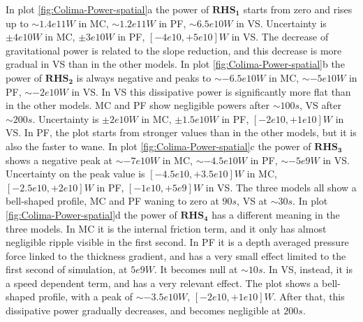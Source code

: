 \documentclass{article}
\begin{document}
In plot \ref{fig:Colima-Power-spatial}a the power of $\boldsymbol{RHS_1}$ starts from zero and rises up to $\sim 1.4e11 W$ in MC, $\sim 1.2e11 W$ in PF, $\sim 6.5e10 W$ in VS. Uncertainty is $\pm 4e10 W$ in MC, $\pm 3e10 W$ in PF, $[-4e10,+5e10] W$ in VS. The decrease of gravitational power is related to the slope reduction, and this decrease is more gradual in VS than in the other models. In plot \ref{fig:Colima-Power-spatial}b the power of  $\boldsymbol{RHS_2}$ is always negative and peaks to $\sim -6.5e10 W$ in MC, $\sim -5e10 W$ in PF, $\sim -2e10 W$ in VS. In VS this dissipative power is significantly more flat than in the other models. MC and PF show negligible powers after $\sim 100 s$, VS after $\sim 200 s$. Uncertainty is $\pm 2e10 W$ in MC, $\pm 1.5e10 W$ in PF, $[-2e10,+1e10] W$ in VS. In PF, the plot starts from stronger values than in the other models, but it is also the faster to wane. In plot \ref{fig:Colima-Power-spatial}c the power of $\boldsymbol{RHS_3}$ shows a negative peak at $\sim -7e10 W$ in MC, $\sim -4.5e10 W$ in PF, $\sim -5e9 W$ in VS. Uncertainty on the peak value is $[-4.5e10,+3.5e10] W$ in MC, $[-2.5e10,+2e10] W$ in PF, $[-1e10,+5e9] W$ in VS. The three models all show a bell-shaped profile, MC and PF waning to zero at $90 s$, VS at $\sim 30 s$. In plot \ref{fig:Colima-Power-spatial}d the power of $\boldsymbol{RHS_4}$ has a different meaning in the three models. In MC it is the internal friction term, and it only has almost negligible ripple visible in the first second. In PF it is a depth averaged pressure force linked to the thickness gradient, and has a very small effect limited to the first second of simulation, at $5e9 W$. It becomes null at $\sim 10 s$. In VS, instead, it is a speed dependent term, and has a very relevant effect. The plot shows a bell-shaped profile, with a peak of $\sim -3.5e10 W$, $[-2e10,+1e10] W$. After that, this dissipative power gradually decreases, and becomes negligible at $200 s$.
\end{document}
